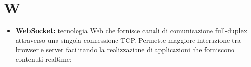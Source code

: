 \section*{\Huge W} %
\label{sec:w}
	\begin{itemize}
		\item \textbf{WebSocket:} tecnologia Web che fornisce canali di comunicazione full-duplex attraverso una singola connessione TCP. Permette maggiore interazione tra browser e server facilitando la realizzazione di applicazioni che forniscono contenuti realtime;
	\end{itemize}
\pagebreak

